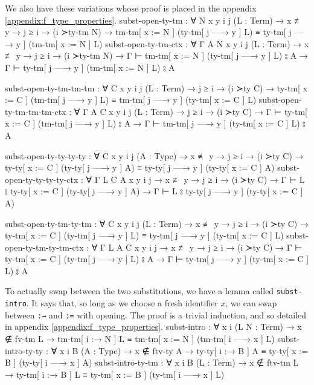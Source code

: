 \documentclass[logo,bsc,singlespacing,parskip,online]{infthesis}
\renewenvironment{code}{\mintedcopy[breaklines,breaksymbolleft=\;]{agda}}{\endmintedcopy}
\begin{document}
We also have these variations whose proof is placed in the appendix
\ref{appendix:f_type_properties}.
\begin{code}
  subst-open-ty-tm : ∀ {N x y i j} (L : Term)
    → x ≢ y → j ≥ i → (i ≻ty-tm N)
    → tm-tm[ x := N ] (ty-tm[ j —→ y ] L)
      ≡ ty-tm[ j —→ y ] (tm-tm[ x := N ] L)
  subst-open-ty-tm-ctx : ∀ {Γ A N x y i j} (L : Term)
    → x ≢ y → j ≥ i → (i ≻ty-tm N)
    → Γ ⊢ tm-tm[ x := N ] (ty-tm[ j —→ y ] L) ⦂ A
    → Γ ⊢ ty-tm[ j —→ y ] (tm-tm[ x := N ] L) ⦂ A

  subst-open-ty-tm-tm-tm : ∀ {C x y i j} (L : Term)
    → j ≥ i → (i ≻ty C)
    → ty-tm[ x := C ] (tm-tm[ j —→ y ] L)
      ≡ tm-tm[ j —→ y ] (ty-tm[ x := C ] L)
  subst-open-ty-tm-tm-tm-ctx : ∀ {Γ A C x y i j} (L : Term)
    → j ≥ i → (i ≻ty C)
    → Γ ⊢ ty-tm[ x := C ] (tm-tm[ j —→ y ] L) ⦂ A
    → Γ ⊢ tm-tm[ j —→ y ] (ty-tm[ x := C ] L) ⦂ A

  subst-open-ty-ty-ty-ty : ∀ {C x y i j} (A : Type)
    → x ≢ y → j ≥ i → (i ≻ty C)
    → ty-ty[ x := C ] (ty-ty[ j —→ y ] A)
      ≡ ty-ty[ j —→ y ] (ty-ty[ x := C ] A)
  subst-open-ty-ty-ty-ty-ctx : ∀ {Γ L C A x y i j}
    → x ≢ y → j ≥ i → (i ≻ty C)
    → Γ ⊢ L ⦂ ty-ty[ x := C ] (ty-ty[ j —→ y ] A)
    → Γ ⊢ L ⦂ ty-ty[ j —→ y ] (ty-ty[ x := C ] A)

  subst-open-ty-tm-ty-tm : ∀ {C x y i j} (L : Term)
    → x ≢ y → j ≥ i → (i ≻ty C)
    → ty-tm[ x := C ] (ty-tm[ j —→ y ] L)
      ≡ ty-tm[ j —→ y ] (ty-tm[ x := C ] L)
  subst-open-ty-tm-ty-tm-ctx : ∀ {Γ L A C x y i j}
    → x ≢ y → j ≥ i → (i ≻ty C)
    → Γ ⊢ ty-tm[ x := C ] (ty-tm[ j —→ y ] L) ⦂ A
    → Γ ⊢ ty-tm[ j —→ y ] (ty-tm[ x := C ] L) ⦂ A
\end{code}

To actually swap between the two substitutions, we have a lemma called \texttt{subst-intro}. It says
that, so long as we choose a fresh identifier $x$, we can swap between \texttt{:→} and \texttt{:=}
with opening. The proof is a trivial induction, and so detailed in appendix \ref{appendix:f_type_properties}.
\begin{code}
  subst-intro : ∀ {x i} (L N : Term) → x ∉ fv-tm L
    → tm-tm[ i :→ N ] L ≡ tm-tm[ x := N ] (tm-tm[ i —→ x ] L)
  subst-intro-ty-ty : ∀ {x i B} (A : Type) → x ∉ ftv-ty A
    → ty-ty[ i :→ B ] A ≡ ty-ty[ x := B ] (ty-ty[ i —→ x ] A)
  subst-intro-ty-tm : ∀ {x i B} (L : Term) → x ∉ ftv-tm L
    → ty-tm[ i :→ B ] L ≡ ty-tm[ x := B ] (ty-tm[ i —→ x ] L)
\end{code}
\end{document}
